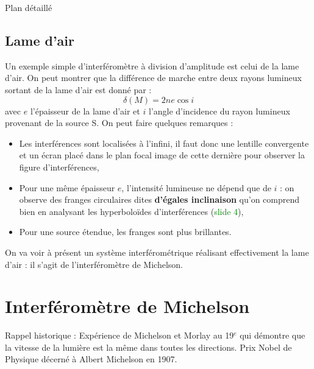\begin{reportBlock}{Plan détaillé}
  \subsection{Lame d'air}
  Un exemple simple d'interféromètre à division d'amplitude est celui de la lame d'air. On peut montrer que la différence de marche entre deux rayons lumineux sortant de la lame d'air est donné par :
  \begin{equation}
      \delta(M) = 2ne\cos{i}
  \end{equation}
  avec $e$ l'épaisseur de la lame d'air et $i$ l'angle d'incidence du rayon lumineux provenant de la source S.
  On peut faire quelques remarques : 
  \begin{itemize}
      \item Les interférences sont localisées à l'infini, il faut donc une lentille convergente et un écran placé dans le plan focal image de cette dernière pour observer la figure d'interférences,
      \item Pour une même épaisseur $e$, l'intensité lumineuse ne dépend que de $i$ : on observe des franges circulaires dites \textbf{d'égales inclinaison} qu'on comprend bien en analysant les hyperboloïdes d'interférences (\textcolor{green}{slide 4}),
      \item Pour une source étendue, les franges sont plus brillantes.
  \end{itemize}
  On va voir à présent un système interférométrique réalisant effectivement la lame d'air : il s'agit de l'interféromètre de Michelson.
  
  \section{Interféromètre de Michelson}
  Rappel historique : Expérience de Michelson et Morlay au 19$^{e}$ qui démontre que la vitesse de la lumière est la même dans toutes les directions. Prix Nobel de Physique décerné à Albert Michelson en 1907.

\end{reportBlock}
